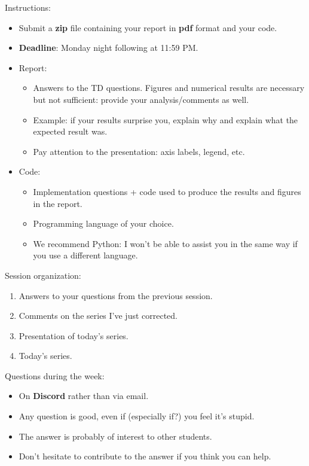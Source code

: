 \begin{frame}
    Instructions: \pause
    \begin{itemize}
    \item Submit a \textbf{zip} file containing your report in \textbf{pdf} format and your code. \pause
    \item \textbf{Deadline}: Monday night following at 11:59 PM. \pause
    \item Report: \pause
    \begin{itemize}
    \item Answers to the TD questions. Figures and numerical results are necessary but not sufficient: provide your analysis/comments as well. \pause
    \item Example: if your results surprise you, explain why and explain what the expected result was. \pause
    \item Pay attention to the presentation: axis labels, legend, etc. \pause
    \end{itemize}
    \item Code: \pause
    \begin{itemize}
        \item Implementation questions + code used to produce the results and figures in the report. \pause
        \item Programming language of your choice. \pause
        \item We recommend Python: I won't be able to assist you in the same way if you use a different language.
    \end{itemize}
\end{itemize}
\end{frame}

\begin{frame}
Session organization: \pause
\vspace{1cm}
\begin{enumerate}
\item Answers to your questions from the previous session. \pause
\item Comments on the series I've just corrected. \pause
\item Presentation of today's series. \pause
\item Today's series.
\end{enumerate}
\end{frame}

\begin{frame}
Questions during the week: \pause
\vspace{1cm}
\begin{itemize}
\item On \textbf{Discord} rather than via email. \pause
\item Any question is good, even if (especially if?) you feel it's stupid. \pause
\item The answer is probably of interest to other students. \pause
\item Don't hesitate to contribute to the answer if you think you can help.
\end{itemize}
\end{frame}


